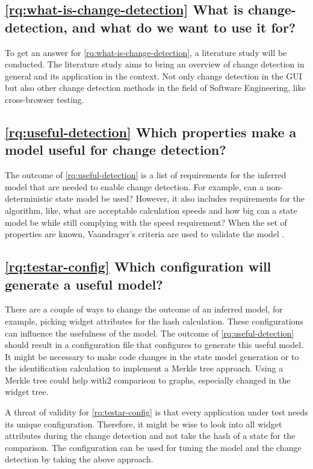 \subsection{\ref{rq:what-is-change-detection} What is change-detection, and what do we want to use it for?}
To get an answer for \ref{rq:what-is-change-detection}, a literature study will be conducted. The literature study aims to bring an overview of change detection in general and its application in the \testar context. Not only change detection in the GUI but also other change detection methods in the field of Software Engineering, like cross-browser testing. 

\subsection{\ref{rq:useful-detection} Which properties make a model useful for change detection?}
The outcome of \ref{rq:useful-detection} is a list of requirements for the inferred model that are needed to enable change detection. For example, can a non-deterministic state model be used? However, it also includes requirements for the algorithm, like, what are acceptable calculation speeds and how big can a state model be while still complying with the speed requirement? When the set of properties are known, Vaandrager's criteria are used to validate the model \cite{vaandrager}.

\subsection{\ref{rq:testar-config} Which \testar configuration will generate a useful model?}
There are a couple of ways to change the outcome of an inferred model, for example, picking widget attributes for the hash calculation. These configurations can influence the usefulness of the model. The outcome of \ref{rq:useful-detection} should result in a \testar configuration file that configures \testar to generate this useful model. It might be necessary to make code changes in the state model generation or to the identification calculation to implement a Merkle tree approach. Using a Merkle tree could help with2 comparison to graphs, especially changed in the widget tree. 

A threat of validity for \ref{rq:testar-config} is that every application under test needs its unique configuration. Therefore, it might be wise to look into all widget attributes during the change detection and not take the hash of a state for the comparison. The configuration can be used for tuning the model and the change detection by taking the above approach.

